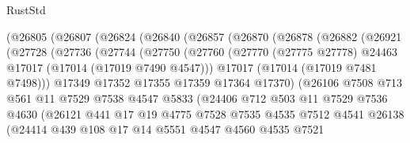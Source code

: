 \begin{lexlean}{RustStd}
\begin{coremodule}
{\begin{coremodule}
{{{{{{{{{{{{{{{{{{{{{{{{{{{{{{{{{{{{{{{{{{{{{{{{{{{{{{{        (@26805
          (@26807
            (@26824
              (@26840
                (@26857
                  (@26870
                    (@26878
                      (@26882
                        (@26921
                          (@27728
                            (@27736
                              (@27744
                                (@27750
                                  (@27760
                                    (@27770
                                      (@27775 @27778)
                                      @24463
                                      @17017
                                      (@17014 (@17019 @7490 @4547)))
                                    @17017
                                    (@17014 (@17019 @7481 @7498)))
                                  @17349
                                  @17352
                                  @17355
                                  @17359
                                  @17364
                                  @17370)
                                (@26106
                                  @7508
                                  @713
                                  @561
                                  @11
                                  @7529
                                  @7538
                                  @4547
                                  @5833
                                  (@24406
                                    @712
                                    @503
                                    @11
                                    @7529
                                    @7536
                                    @4630
                                    (@26121
                                      @441
                                      @17
                                      @19
                                      @4775
                                      @7528
                                      @7535
                                      @4535
                                      @7512
                                      @4541
                                      @26138
                                      (@24414
                                        @439
                                        @108
                                        @17
                                        @14
                                        @5551
                                        @4547
                                        @4560
                                        @4535
                                        @7521
}}}}}}}}}}}}}}}}}}}}}}}}}}}}}}}}}}}}}}}}}}}}}}}}}}}}}}}
\end{coremodule}}
\end{coremodule}
\end{lexlean}
